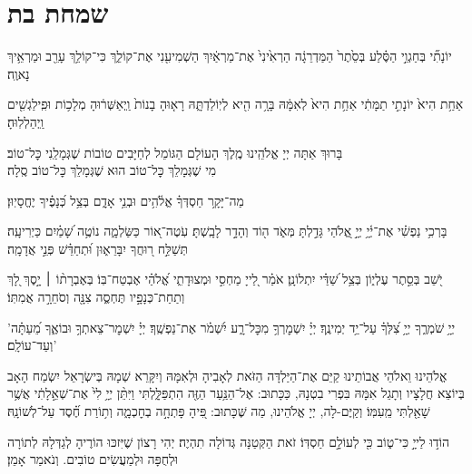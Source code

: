 \documentclass[twoside, openany, parskip=half, 11pt]{book}
\begin{document}
\chapter[שמחת בת]{ שמחת בת }

%
יוֹנָתִ֞י בְּחַגְוֵ֣י הַסֶּ֗לַע בְּסֵ֙תֶר֙ הַמַּדְרֵגָ֔ה הַרְאִ֙ינִי֙ אֶת־מַרְאַ֔יִךְ הַשְׁמִיעִ֖נִי אֶת־קוֹלֵ֑ךְ כִּי־קוֹלֵ֥ךְ עָרֵ֖ב וּמַרְאֵ֥יךְ נָאוֶֽה׃

%
אַחַ֥ת הִיא֙ יוֹנָתִ֣י תַמָּתִ֔י אַחַ֥ת הִיא֙ לְאִמָּ֔הּ בָּרָ֥ה הִ֖יא לְיֽוֹלַדְתָּ֑הּ רָא֤וּהָ בָנוֹת֙ וַֽיְאַשְּׁר֔וּהָ מְלָכ֥וֹת וּפִֽילַגְשִׁ֖ים וַֽיְהַלְלֽוּהָ׃

בָּרוּךְ אַתָּה יְיָ אֱלֹהֵֽינוּ מֶֽלֶךְ הָעוֹלָם הַגּוֹמֵל לְחַיָּבִים טוֹבוֹת שֶׁגְּמָלַֽנִי כׇּל־טוֹב׃\\
\kahal
מִי שֶׁגְּמָלֵךְ כׇּל־טוֹב הוּא שֶׁגְּמָלֵךְ כׇּל־טוֹב סֶֽלָה׃

%
מַה־יָּקָ֥ר חַסְדְּךָ֗ אֱלֹ֫הִ֥ים וּבְנֵ֥י אָדָ֑ם בְּצֵ֥ל כְּ֝נָפֶ֗יךָ יֶחֱסָיֽוּן׃

%
בָּרְכִ֥י נַפְשִׁ֗י אֶת־יְ֫יָ֥ יְיָ֣ אֱ֭לֹהַי גָּדַ֣לְתָּ מְּאֹ֑ד ה֖וֹד וְהָדָ֣ר לָבָֽשְׁתָּ׃
עֹֽטֶה־א֭וֹר כַּשַּׂלְמָ֑ה נוֹטֶ֥ה שָׁ֝מַ֗יִם כַּיְרִיעָֽה׃
תְּשַׁלַּ֣ח ר֭וּחֲךָ יִבָּרֵא֑וּן וּ֝תְחַדֵּ֗שׁ פְּנֵ֣י אֲדָמָֽה׃

יֹ֭שֵׁב  בְּסֵ֣תֶר עֶלְי֑וֹן בְּצֵ֥ל שַׁ֝דַּ֗י יִתְלוֹנָֽן׃
אֹמַ֗ר לַ֭ייָ מַחְסִ֣י וּמְצוּדָתִ֑י אֱ֝לֹהַ֗י אֶבְטַח־בּֽוֹ׃
בְּאֶבְרָת֨וֹ ׀ יָ֣סֶךְ לָ֭ךְ וְתַחַת־כְּנָפָ֣יו תֶּחְסֶ֑ה צִנָּ֖ה וְסֹחֵרָ֣ה אֲמִתּֽוֹ׃

%
'יְיָ֥ שֹׁמְרֶ֑ךָ יְיָ֥ צִ֝לְּךָ֗ עַל־יַ֥ד יְמִינֶֽךָ׃ יְיָ֗ יִשְׁמׇרְךָ֥ מִכׇּל־רָ֑ע יִ֝שְׁמֹ֗ר אֶת־נַפְשֶֽׁךָ׃ יְיָ֗ יִשְׁמׇר־צֵאתְךָ֥ וּבוֹאֶ֑ךָ מֵ֝עַתָּ֗ה וְעַד־עוֹלָֽם׃'

אֱלֹהֵינוּ וֵאלֹהֵי אֲבוֹתֵינוּ  קַיֵּם אֶת־הַיַּלְדָּה הַזֹּאת לְאָבִיהָ וּלְאִמָּהּ וְיִקָּרֵא שְׁמָהּ בְּישְׂרָאֵל   יִשְׂמַח הָאָב בְּיוֹצֵא חֲלָצָיו וְתָגֵל אִמָּהּ בִּפְרִי בִטְנָהּ, כַּכָּתוּב: 
אֶל־הַנַּ֥עַר הַזֶּ֖ה הִתְפַּלָּ֑לְתִּי וַיִּתֵּ֨ן יְיָ֥ לִי֙ אֶת־שְׁאֵ֣לָתִ֔י אֲשֶׁ֥ר שָׁאַ֖לְתִּי מֵֽעִמּֽוֹ׃ וְקַיֶּם-לָה, יְיָ אֱלֹהֵינוּ, מַה שֶּׁכָּתוּב:
פִּ֭יהָ פָּתְחָ֣ה בְחׇכְמָ֑ה וְת֥וֹרַת חֶ֝֗סֶד עַל־לְשׁוֹנָֽהּ׃

הוֹד֣וּ לַייָ֣ כִּי־ט֑וֹב כִּ֖י לְעוֹלָ֣ם חַסְדּֽוֹ׃
זֹאת הַקְּטַנָּה  גְּדוֹלָה תִהְיֶה׃ יְהִי רָצוֹן שֶׁיִּזכּוּ הוֹרֶיהָ לְגַדְּלָהּ לְתוֹרָה וּלְחֻפָּה וּלְמַעֲשִׂים טוֹבִים. וְנֹאמַר אָמֵן׃
\end{document}
